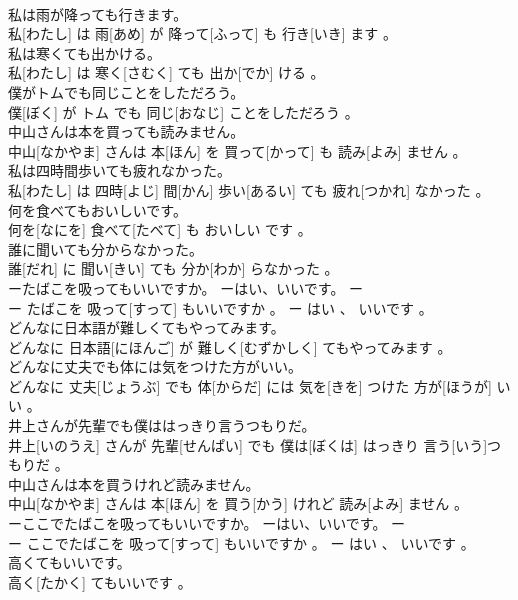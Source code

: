 \documentclass[8pt]{extreport}
\begin{document}
\begin{CJK}{UTF8}{min}
\\	私は雨が降っても行きます。	
\\	私[わたし] は 雨[あめ] が 降って[ふって] も 行き[いき] ます 。
\\	私は寒くても出かける。	
\\	私[わたし] は 寒く[さむく] ても 出か[でか] ける 。
\\	僕がトムでも同じことをしただろう。	
\\	僕[ぼく] が トム でも 同じ[おなじ] ことをしただろう 。
\\	中山さんは本を買っても読みません。	
\\	中山[なかやま] さんは 本[ほん] を 買って[かって] も 読み[よみ] ません 。
\\	私は四時間歩いても疲れなかった。	
\\	私[わたし] は 四時[よじ] 間[かん] 歩い[あるい] ても 疲れ[つかれ] なかった 。
\\	何を食べてもおいしいです。	
\\	何を[なにを] 食べて[たべて] も おいしい です 。
\\	誰に聞いても分からなかった。	
\\	誰[だれ] に 聞い[きい] ても 分か[わか] らなかった 。
\\	ーたばこを吸ってもいいですか。 ーはい、いいです。	ー
\\	ー たばこを 吸って[すって] もいいですか 。 ー はい 、 いいです 。
\\	どんなに日本語が難しくてもやってみます。	
\\	どんなに 日本語[にほんご] が 難しく[むずかしく] てもやってみます 。
\\	どんなに丈夫でも体には気をつけた方がいい。	
\\	どんなに 丈夫[じょうぶ] でも 体[からだ] には 気を[きを] つけた 方が[ほうが] いい 。
\\	井上さんが先輩でも僕ははっきり言うつもりだ。	
\\	井上[いのうえ] さんが 先輩[せんぱい] でも 僕は[ぼくは] はっきり 言う[いう]つもりだ 。
\\	中山さんは本を買うけれど読みません。	
\\	中山[なかやま] さんは 本[ほん] を 買う[かう] けれど 読み[よみ] ません 。
\\	ーここでたばこを吸ってもいいですか。 ーはい、いいです。	ー
\\	ー ここでたばこを 吸って[すって] もいいですか 。 ー はい 、 いいです 。
\\	高くてもいいです。	
\\	高く[たかく] てもいいです 。

\end{CJK}
\end{document}
